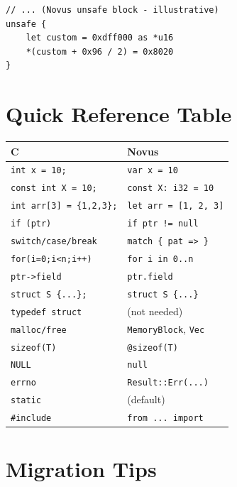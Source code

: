 \begin{lstlisting}
// ... (Novus unsafe block - illustrative)
unsafe {
    let custom = 0xdff000 as *u16
    *(custom + 0x96 / 2) = 0x8020
}
\end{lstlisting}

\section{Quick Reference Table}

\begin{center}
\begin{tabular}{ll}
\textbf{C} & \textbf{Novus} \\
\hline
\texttt{int x = 10;} & \texttt{var x = 10} \\
\texttt{const int X = 10;} & \texttt{const X: i32 = 10} \\
\texttt{int arr[3] = \{1,2,3\};} & \texttt{let arr = [1, 2, 3]} \\
\texttt{if (ptr)} & \texttt{if ptr != null} \\
\texttt{switch/case/break} & \texttt{match \{ pat => \}} \\
\texttt{for(i=0;i<n;i++)} & \texttt{for i in 0..n} \\
\texttt{ptr->field} & \texttt{ptr.field} \\
\texttt{struct S \{...\};} & \texttt{struct S \{...\}} \\
\texttt{typedef struct} & (not needed) \\
\texttt{malloc/free} & \texttt{MemoryBlock}, \texttt{Vec} \\
\texttt{sizeof(T)} & \texttt{@sizeof(T)} \\
\texttt{NULL} & \texttt{null} \\
\texttt{errno} & \texttt{Result::Err(...)} \\
\texttt{static} & (default) \\
\texttt{\#include} & \texttt{from ... import} \\
\end{tabular}
\end{center}

\section{Migration Tips}

